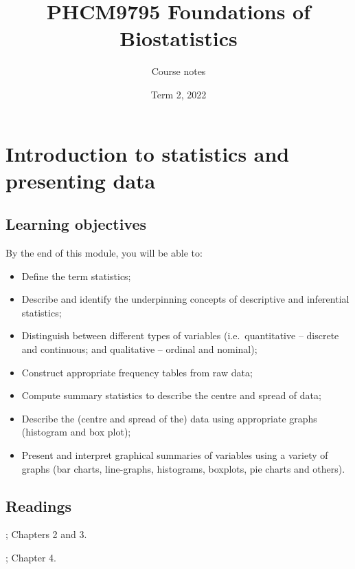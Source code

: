 \documentclass[
]{memoir}
\title{PHCM9795 Foundations of Biostatistics}
\author{Course notes}
\date{Term 2, 2022}
\providecommand{\tightlist}{%
  \setlength{\itemsep}{0pt}\setlength{\parskip}{0pt}}
\begin{document}
\maketitle

{
\setcounter{tocdepth}{1}
\tableofcontents
}
\hypertarget{introduction-to-statistics-and-presenting-data}{%
\chapter{Introduction to statistics and presenting data}\label{introduction-to-statistics-and-presenting-data}}

\hypertarget{learning-objectives}{%
\section*{Learning objectives}\label{learning-objectives}}

By the end of this module, you will be able to:

\begin{itemize}
\tightlist
\item
  Define the term statistics;
\item
  Describe and identify the underpinning concepts of descriptive and inferential statistics;
\item
  Distinguish between different types of variables (i.e.~quantitative -- discrete and continuous; and qualitative -- ordinal and nominal);
\item
  Construct appropriate frequency tables from raw data;
\item
  Compute summary statistics to describe the centre and spread of data;
\item
  Describe the (centre and spread of the) data using appropriate graphs (histogram and box plot);
\item
  Present and interpret graphical summaries of variables using a variety of graphs (bar charts, line-graphs, histograms, boxplots, pie charts and others).
\end{itemize}

\hypertarget{readings}{%
\section*{Readings}\label{readings}}

\citep{kirkwood_sterne01}; Chapters 2 and 3.

\citep{bland15}; Chapter 4.
\end{document}
